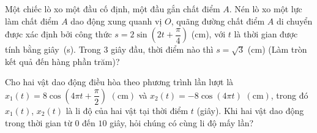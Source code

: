 \begin{ex}%
	Một chiếc lò xo một đầu cố định, một đầu gắn chất điểm $A$. Nén lò xo một  lực làm chất điểm $A$ dao động xung quanh vị $O$, quãng đường chất điểm $A$ di chuyển được xác định bởi công thức $s=2\sin\left(2t+\dfrac{\pi}{4}\right)$ (cm), với $t$ là thời gian được tính bằng giây~(s). Trong $3$ giây đầu, thời điểm nào thì $s = \sqrt{3}$ (cm) (Làm tròn kết quả đến hàng phần trăm)?
\end{ex}

\begin{ex}%
	Cho hai vật dao động điều hòa theo phương trình lần lượt là $x_1(t)=8\cos\left(4\pi  t+\dfrac{\pi}{2}\right)$ $(\mathrm{cm})$ và $x_2(t)=-8\cos (4\pi t)$ $(\mathrm{cm})$, trong đó $x_1(t)$, $x_2(t)$ là li độ của hai vật tại thời điểm $t$ (giây). Khi hai vật dao động trong thời gian từ $0$ đến $10$ giây, hỏi chúng có cùng li độ mấy lần?
\end{ex}

